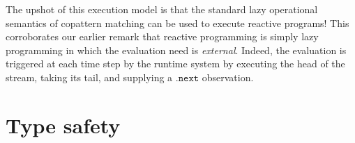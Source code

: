 \documentclass[11pt]{article}
\renewcommand{\next}{\mathtt{.next}}
\begin{document}
The upshot of this execution model is that the standard lazy operational
semantics of copattern matching can be used to execute reactive programs!
This corroborates our earlier remark that reactive programming is simply lazy
programming in which the evaluation need is \emph{external}.
Indeed, the evaluation is triggered at each time step by the runtime system by
executing the head of the stream, taking its tail, and supplying a $\next$
observation.

\section{Type safety}


\pagebreak
\printbibliography%
\end{document}
